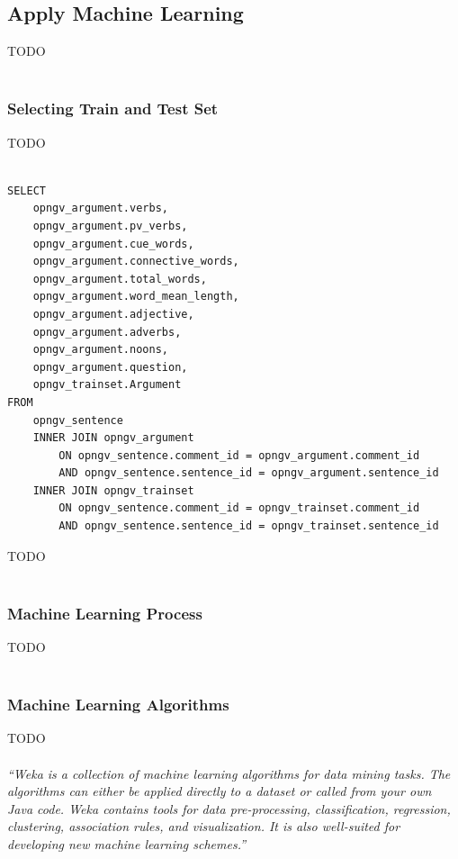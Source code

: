 \subsection{Apply Machine Learning}\label{323_ref}
TODO\\
\\
\subsubsection{Selecting Train and Test Set}\label{3231_ref}
TODO\\
\\
\lstset{language=SQL}
\begin{lstlisting}[frame=single, basicstyle=\small]
SELECT
	opngv_argument.verbs,
	opngv_argument.pv_verbs,
	opngv_argument.cue_words,
	opngv_argument.connective_words,
	opngv_argument.total_words,
	opngv_argument.word_mean_length,
	opngv_argument.adjective,
	opngv_argument.adverbs,
	opngv_argument.noons,
	opngv_argument.question,
	opngv_trainset.Argument
FROM
	opngv_sentence
	INNER JOIN opngv_argument
		ON opngv_sentence.comment_id = opngv_argument.comment_id
	 	AND opngv_sentence.sentence_id = opngv_argument.sentence_id
	INNER JOIN opngv_trainset
	 	ON opngv_sentence.comment_id = opngv_trainset.comment_id
	 	AND opngv_sentence.sentence_id = opngv_trainset.sentence_id

\end{lstlisting}
TODO\\
\\

\subsubsection{Machine Learning Process}\label{3232_ref}
TODO\\
\\
\subsubsection{Machine Learning Algorithms}\label{3233_ref}
TODO\\
\\

\textit{“Weka is a collection of machine learning algorithms for data mining tasks. The algorithms can either be applied directly to a dataset or called from your own Java code. Weka contains tools for data pre-processing, classification, regression, clustering, association rules, and visualization. It is also well-suited for developing new machine learning schemes.”}

